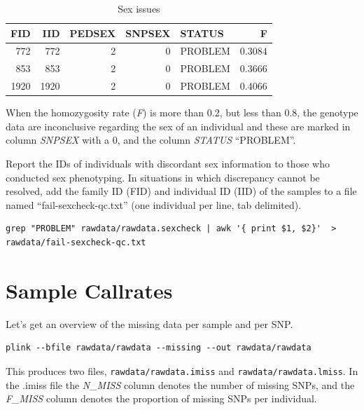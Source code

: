 \documentclass[
]{book}
\begin{document}
\begin{table}

\caption{\label{tab:unnamed-chunk-1}Sex issues}
\centering
\begin{tabular}[t]{r|r|r|r|l|r}
\hline
FID & IID & PEDSEX & SNPSEX & STATUS & F\\
\hline
772 & 772 & 2 & 0 & PROBLEM & 0.3084\\
\hline
853 & 853 & 2 & 0 & PROBLEM & 0.3666\\
\hline
1920 & 1920 & 2 & 0 & PROBLEM & 0.4066\\
\hline
\end{tabular}
\end{table}

When the homozygosity rate (\emph{F}) is more than 0.2, but less than 0.8, the genotype data are inconclusive regarding the sex of an individual and these are marked in column \emph{SNPSEX} with a 0, and the column \emph{STATUS} ``PROBLEM''.

Report the IDs of individuals with discordant sex information to those who conducted sex phenotyping. In situations in which discrepancy cannot be resolved, add the family ID (FID) and individual ID (IID) of the samples to a file named ``fail-sexcheck-qc.txt'' (one individual per line, tab delimited).

\begin{verbatim}
grep "PROBLEM" rawdata/rawdata.sexcheck | awk '{ print $1, $2}'  > rawdata/fail-sexcheck-qc.txt
\end{verbatim}

\hypertarget{sample-callrates}{%
\section{Sample Callrates}\label{sample-callrates}}

Let's get an overview of the missing data per sample and per SNP.

\begin{verbatim}
plink --bfile rawdata/rawdata --missing --out rawdata/rawdata
\end{verbatim}

This produces two files, \texttt{rawdata/rawdata.imiss} and \texttt{rawdata/rawdata.lmiss}. In the .imiss file the \emph{N\_MISS} column denotes the number of missing SNPs, and the \emph{F\_MISS} column denotes the proportion of missing SNPs per individual.
\end{document}
